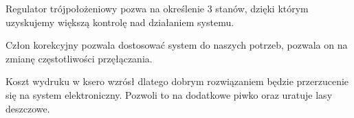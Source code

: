 \documentclass[a4paper,10pt]{article}
\begin{document}
Regulator trójpołożeniowy pozwa na określenie 3 stanów, dzięki którym uzyskujemy większą kontrolę nad działaniem systemu.

Człon korekcyjny pozwala dostosować system do naszych potrzeb, pozwala on na zmianę częstotliwości przęłączania.

Koszt wydruku w ksero wzrósł dlatego dobrym rozwiązaniem będzie przerzucenie się na system elektroniczny. 
Pozwoli to na dodatkowe piwko oraz uratuje lasy deszczowe.
\end{document}

